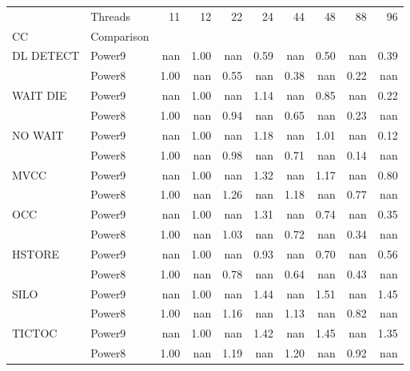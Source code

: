\begin{tabular}{llrrrrrrrr}
\toprule
       & Threads &   11 &   12 &   22 &   24 &   44 &   48 &   88 &   96 \\
CC & Comparison &      &      &      &      &      &      &      &      \\
\midrule
DL DETECT & Power9 &  nan & 1.00 &  nan & 0.59 &  nan & 0.50 &  nan & 0.39 \\
       & Power8 & 1.00 &  nan & 0.55 &  nan & 0.38 &  nan & 0.22 &  nan \\
WAIT DIE & Power9 &  nan & 1.00 &  nan & 1.14 &  nan & 0.85 &  nan & 0.22 \\
       & Power8 & 1.00 &  nan & 0.94 &  nan & 0.65 &  nan & 0.23 &  nan \\
NO WAIT & Power9 &  nan & 1.00 &  nan & 1.18 &  nan & 1.01 &  nan & 0.12 \\
       & Power8 & 1.00 &  nan & 0.98 &  nan & 0.71 &  nan & 0.14 &  nan \\
MVCC & Power9 &  nan & 1.00 &  nan & 1.32 &  nan & 1.17 &  nan & 0.80 \\
       & Power8 & 1.00 &  nan & 1.26 &  nan & 1.18 &  nan & 0.77 &  nan \\
OCC & Power9 &  nan & 1.00 &  nan & 1.31 &  nan & 0.74 &  nan & 0.35 \\
       & Power8 & 1.00 &  nan & 1.03 &  nan & 0.72 &  nan & 0.34 &  nan \\
HSTORE & Power9 &  nan & 1.00 &  nan & 0.93 &  nan & 0.70 &  nan & 0.56 \\
       & Power8 & 1.00 &  nan & 0.78 &  nan & 0.64 &  nan & 0.43 &  nan \\
SILO & Power9 &  nan & 1.00 &  nan & 1.44 &  nan & 1.51 &  nan & 1.45 \\
       & Power8 & 1.00 &  nan & 1.16 &  nan & 1.13 &  nan & 0.82 &  nan \\
TICTOC & Power9 &  nan & 1.00 &  nan & 1.42 &  nan & 1.45 &  nan & 1.35 \\
       & Power8 & 1.00 &  nan & 1.19 &  nan & 1.20 &  nan & 0.92 &  nan \\
\bottomrule
\end{tabular}
